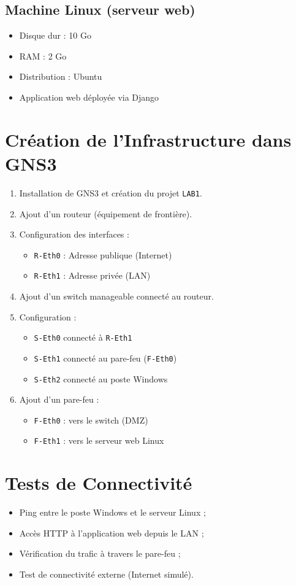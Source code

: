 \documentclass[a4paper,12pt]{report}
\begin{document}
\subsection*{Machine Linux (serveur web)}
\begin{itemize}
    \item Disque dur : 10 Go
    \item RAM : 2 Go
    \item Distribution : Ubuntu 
    \item Application web déployée via Django
\end{itemize}

\section{Création de l’Infrastructure dans GNS3}
\begin{enumerate}
    \item Installation de GNS3 et création du projet \texttt{LAB1}.
    \item Ajout d’un routeur (équipement de frontière).
    \item Configuration des interfaces :
    \begin{itemize}
        \item \texttt{R-Eth0} : Adresse publique (Internet)
        \item \texttt{R-Eth1} : Adresse privée (LAN)
    \end{itemize}
    \item Ajout d’un switch manageable connecté au routeur.
    \item Configuration :
    \begin{itemize}
        \item \texttt{S-Eth0} connecté à \texttt{R-Eth1}
        \item \texttt{S-Eth1} connecté au pare-feu (\texttt{F-Eth0})
        \item \texttt{S-Eth2} connecté au poste Windows
    \end{itemize}
    \item Ajout d’un pare-feu :
    \begin{itemize}
        \item \texttt{F-Eth0} : vers le switch (DMZ)
        \item \texttt{F-Eth1} : vers le serveur web Linux
    \end{itemize}
\end{enumerate}

\section{Tests de Connectivité}
\begin{itemize}
    \item Ping entre le poste Windows et le serveur Linux ;
    \item Accès HTTP à l’application web depuis le LAN ;
    \item Vérification du trafic à travers le pare-feu ;
    \item Test de connectivité externe (Internet simulé).
\end{itemize}
\end{document}
